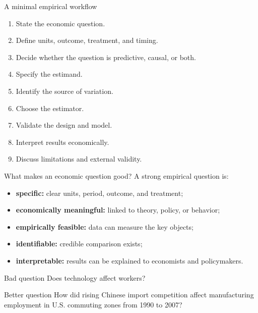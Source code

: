 \documentclass[aspectratio=169,11pt]{beamer}
\begin{document}
\begin{frame}{A minimal empirical workflow}
\begin{enumerate}
  \item State the economic question.
  \item Define units, outcome, treatment, and timing.
  \item Decide whether the question is predictive, causal, or both.
  \item Specify the estimand.
  \item Identify the source of variation.
  \item Choose the estimator.
  \item Validate the design and model.
  \item Interpret results economically.
  \item Discuss limitations and external validity.
\end{enumerate}
\end{frame}

\begin{frame}{What makes an economic question good?}
A strong empirical question is:
\begin{itemize}
  \item \textbf{specific:} clear units, period, outcome, and treatment;
  \item \textbf{economically meaningful:} linked to theory, policy, or behavior;
  \item \textbf{empirically feasible:} data can measure the key objects;
  \item \textbf{identifiable:} credible comparison exists;
  \item \textbf{interpretable:} results can be explained to economists and policymakers.
\end{itemize}
\begin{block}{Bad question}
Does technology affect workers?
\end{block}
\begin{alertblock}{Better question}
How did rising Chinese import competition affect manufacturing employment in U.S. commuting zones from 1990 to 2007?
\end{alertblock}
\end{frame}
\end{document}
